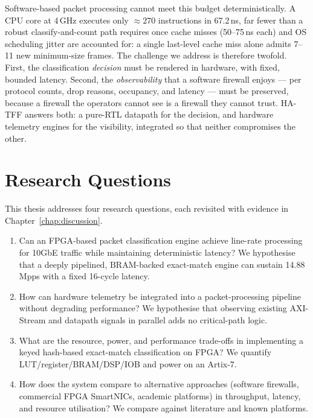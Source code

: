 \documentclass[12pt,twoside,openright]{book}
\begin{document}
Software-based packet processing cannot meet this budget deterministically. A CPU core at 4\,GHz
executes only $\approx 270$ instructions in 67.2\,ns, far fewer than a robust classify-and-count
path requires once cache misses (50--75\,ns each) and OS scheduling jitter are accounted for: a
single last-level cache miss alone admits 7--11 new minimum-size frames. The challenge we address is
therefore twofold. First, the classification \emph{decision} must be rendered in hardware, with
fixed, bounded latency. Second, the \emph{observability} that a software firewall enjoys --- per
protocol counts, drop reasons, occupancy, and latency --- must be preserved, because a firewall
the operators cannot see is a firewall they cannot trust. HA-TFF answers both: a pure-RTL datapath
for the decision, and hardware telemetry engines for the visibility, integrated so that neither
compromises the other.

\section{Research Questions}

This thesis addresses four research questions, each revisited with evidence in
Chapter~\ref{chap:discussion}.

\begin{enumerate}[itemsep=4pt]
  \item[\textbf{RQ1}] Can an FPGA-based packet classification engine achieve line-rate processing
        for 10GbE traffic while maintaining deterministic latency? We hypothesise that a deeply
        pipelined, BRAM-backed exact-match engine can sustain 14.88\,Mpps with a fixed 16-cycle
        latency.
  \item[\textbf{RQ2}] How can hardware telemetry be integrated into a packet-processing pipeline
        without degrading performance? We hypothesise that observing existing AXI-Stream and
        datapath signals in parallel adds no critical-path logic.
  \item[\textbf{RQ3}] What are the resource, power, and performance trade-offs in implementing a
        keyed hash-based exact-match classification on FPGA? We quantify LUT/register/BRAM/DSP/IOB
        and power on an Artix-7.
  \item[\textbf{RQ4}] How does the system compare to alternative approaches (software firewalls,
        commercial FPGA SmartNICs, academic platforms) in throughput, latency, and resource
        utilisation? We compare against literature and known platforms.
\end{enumerate}
\end{document}
